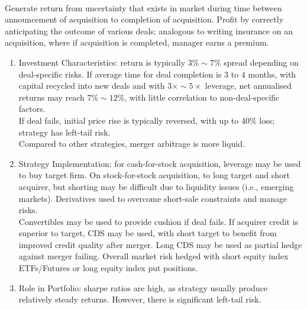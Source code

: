 \begin{remark} \\
Generate return from uncertainty that exists in market during time between announcement of acquisition to completion of acquisition. Profit by correctly anticipating the outcome of various deals; analogous to writing insurance on an acquisition, where if acquisition is completed, manager earns a premium.
\begin{enumerate}[label=\roman*.]
\setlength{\itemsep}{0pt}
\item Investment Characteristics: return is typically $3\% \sim 7\%$ spread depending on deal-specific risks. If average time for deal completion is $3$ to $4$ months, with capital recycled into new deals and with $3 \times \sim 5 \times$ leverage, net annualised returns may reach $7\% \sim 12\%$, with little correlation to non-deal-specific factors.\\
If deal fails, initial price rise is typically reversed, with up to $40\%$ loss; strategy has left-tail risk.\\
Compared to other strategies, merger arbitrage is more liquid.
\item Strategy Implementation: for cash-for-stock acquisition, leverage may be used to buy target firm. On stock-for-stock acquisition, to long target and short acquirer, but shorting may be difficult due to liquidity issues (i.e., emerging markets). Derivatives used to overcome short-sale constraints and manage risks.\\
Convertibles may be used to provide cushion if deal fails. If acquirer credit is superior to target, CDS may be used, with short target to benefit from improved credit quality after merger. Long CDS may be used as partial hedge against merger failing. Overall market risk hedged with short equity index ETFs/Futures or long equity index put positions.
\item Role in Portfolio: sharpe ratios are high, as strategy usually produce relatively steady returns. However, there is significant left-tail risk.
\end{enumerate}
\end{remark}

